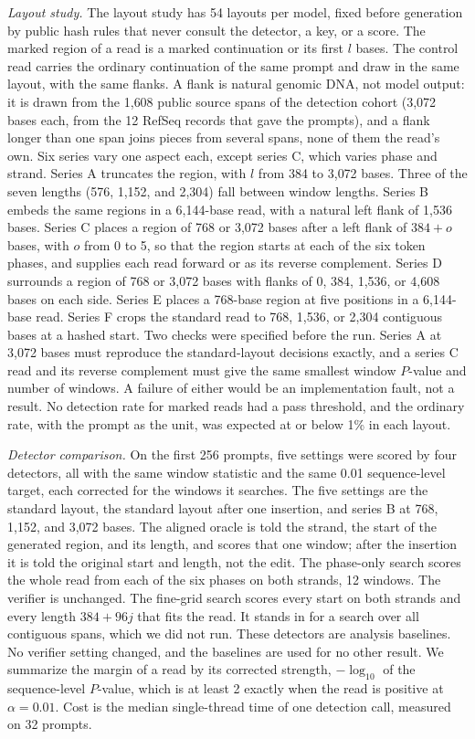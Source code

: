 \documentclass[10pt,twocolumn]{article}
\begin{document}
\textit{Layout study.} The layout study has 54 layouts per model, fixed before generation by public
hash rules that never consult the detector, a key, or a score. The marked region of a read is a
marked continuation or its first $l$ bases. The control read carries the ordinary continuation of
the same prompt and draw in the same layout, with the same flanks. A flank is natural genomic DNA,
not model output: it is drawn from the 1{,}608 public source spans of the detection cohort (3{,}072
bases each, from the 12 RefSeq records that gave the prompts), and a flank longer than one span joins
pieces from several spans, none of them the read's own. Six series vary one aspect each, except series C, which varies phase and strand.
Series A truncates the region, with $l$ from 384 to 3{,}072 bases. Three of the seven lengths (576,
1{,}152, and 2{,}304) fall between window lengths. Series B embeds the same regions in a 6{,}144-base
read, with a natural left flank of 1{,}536 bases. Series C places a region of 768 or 3{,}072 bases
after a left flank of $384 + o$ bases, with $o$ from 0 to 5, so that the region starts at each of the
six token phases, and supplies each read forward or as its reverse complement. Series D surrounds a
region of 768 or 3{,}072 bases with flanks of 0, 384, 1{,}536, or 4{,}608 bases on each side. Series E
places a 768-base region at five positions in a 6{,}144-base read. Series F crops the standard read
to 768, 1{,}536, or 2{,}304 contiguous bases at a hashed start. Two checks were specified before the
run. Series A at 3{,}072 bases must reproduce the standard-layout decisions exactly, and a series C
read and its reverse complement must give the same smallest window $P$-value and number of windows. A
failure of either would be an implementation fault, not a result. No detection rate for marked reads
had a pass threshold, and the ordinary rate, with the prompt as the unit, was expected at or below 1\% in each layout.

\textit{Detector comparison.} On the first 256 prompts, five settings were scored by four detectors,
all with the same window statistic and the same 0.01 sequence-level target, each corrected for the
windows it searches. The five settings are the standard layout, the standard layout after one
insertion, and series B at 768, 1{,}152, and 3{,}072 bases. The aligned oracle is told the strand,
the start of the generated region, and its length, and scores that one window; after the insertion
it is told the original start and length, not the edit. The phase-only search scores the whole read
from each of the six phases on both strands, 12 windows. The verifier is unchanged. The fine-grid
search scores every start on both strands and every length $384 + 96j$ that fits the read. It stands
in for a search over all contiguous spans, which we did not run. These detectors are analysis
baselines. No verifier setting changed, and the baselines are used for no other result. We summarize
the margin of a read by its corrected strength, $-\log_{10}$ of the sequence-level $P$-value, which
is at least 2 exactly when the read is positive at $\alpha = 0.01$. Cost is the median
single-thread time of one detection call, measured on 32 prompts.
\end{document}
